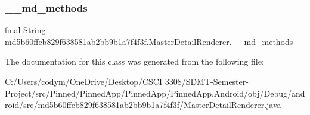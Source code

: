 \subsubsection{\texorpdfstring{\+\_\+\+\_\+md\+\_\+methods}{\_\_md\_methods}}
{\footnotesize\ttfamily final String md5b60ffeb829f638581ab2bb9b1a7f4f3f.\+Master\+Detail\+Renderer.\+\_\+\+\_\+md\+\_\+methods\hspace{0.3cm}{\ttfamily [static]}}



The documentation for this class was generated from the following file\+:\begin{DoxyCompactItemize}
\item 
C\+:/\+Users/codym/\+One\+Drive/\+Desktop/\+C\+S\+C\+I 3308/\+S\+D\+M\+T-\/\+Semester-\/\+Project/src/\+Pinned/\+Pinned\+App/\+Pinned\+App/\+Pinned\+App.\+Android/obj/\+Debug/android/src/md5b60ffeb829f638581ab2bb9b1a7f4f3f/Master\+Detail\+Renderer.\+java\end{DoxyCompactItemize}
